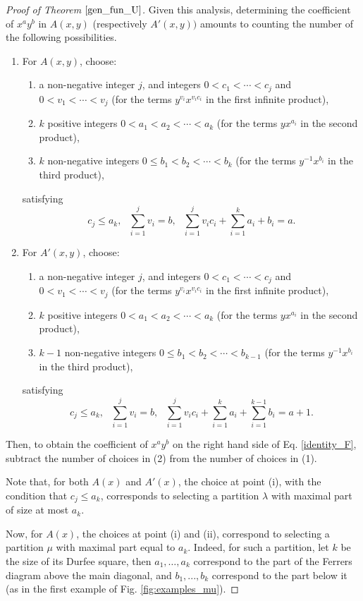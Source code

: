 \documentclass[a4paper, 12pt, oneside]{amsart}
\theoremstyle{definition}
\begin{document}
\begin{proof}[Proof of Theorem $\ref{gen_fun_U}$]
Given this analysis, determining the coefficient of $x^ay^b$ in $A(x,y)$ (respectively $A'(x,y))$  amounts to counting the number of the following possibilities.
\begin{enumerate}[label=(\arabic*)]
    \item For $A(x,y)$, choose: 
    \begin{enumerate}[label=(\roman*)]
        \item a non-negative integer $j$, and integers $0<c_1 < \cdots < c_j$ and $0 <v_1< \cdots <v_j$ (for the terms $y^{v_i}x^{v_ic_i}$ in the first infinite product),
        \item $k$ positive integers $0<a_1<a_2<\cdots<a_k$ (for the terms $yx^{a_i}$ in the second product),
        \item $k$ non-negative integers $0 \le b_1 < b_2 < \cdots < b_k$ (for the terms $y^{-1}x^{b{_i}}$ in the third product),
    \end{enumerate}
satisfying
$$c_j \le a_k,\text{ } \sum_{i=1}^jv_i=b,\text{ } \sum_{i=1}^{j}v_ic_i+\sum_{i=1}^ka_i+b_i=a.$$
\item For $A'(x,y)$, choose:
 \begin{enumerate}[label=(\roman*)]
        \item a non-negative integer $j$, and integers $0<c_1 < \cdots < c_j$ and $0 <v_1< \cdots <v_j$ (for the terms $y^{v_i}x^{v_ic_i}$ in the first infinite product),
        \item $k$ positive integers $0<a_1<a_2<\cdots<a_k$ (for the terms $yx^{a_i}$ in the second product),
        \item $k-1$ non-negative integers $0 \le b_1 < b_2 < \cdots < b_{k-1}$ (for the terms $y^{-1}x^{b{_i}}$ in the third product),
    \end{enumerate}
satisfying
$$c_j \le a_k,\text{ }\sum_{i=1}^jv_i=b,\text{ }\sum_{i=1}^{j}v_ic_i+\sum_{i=1}^ka_i+\sum_{i=1}^{k-1}b_i=a+1.$$
\end{enumerate}
Then, to obtain the coefficient of $x^ay^b$ on the right hand side of Eq. \eqref{identity_F}, subtract the number of choices 
in (2) from the number of choices in (1).

Note that, for both $A(x)$ and $A'(x)$, the choice at point (i), with the condition that $c_j \le a_k$, corresponds to selecting a partition $\lambda$ with maximal part of size at most $a_k$.

Now, for $A(x)$, the choices at point (i) and (ii), correspond to selecting  a partition $\mu$ with maximal part equal to $a_k$. Indeed, for such a partition, let $k$ be the size of its Durfee square, then $a_1,\dots,a_k$ correspond to the part of the Ferrers diagram above the main diagonal, and $b_1,...,b_k$ correspond to the part below it (as in the first example of Fig. \ref{fig:examples_mu}).


\end{proof}
\end{document}
